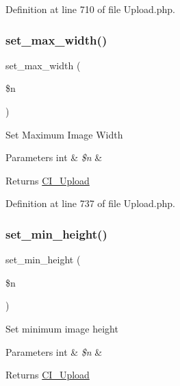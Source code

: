 Definition at line 710 of file Upload.\+php.

\mbox{\label{class_c_i___upload_a4028f187a825a666976cc3fe47cd44a8}} 
\subsubsection{\texorpdfstring{set\_max\_width()}{set\_max\_width()}}
{\footnotesize\ttfamily set\+\_\+max\+\_\+width (\begin{DoxyParamCaption}\item[{}]{\$n }\end{DoxyParamCaption})}

Set Maximum Image Width


\begin{DoxyParams}[1]{Parameters}
int & {\em \$n} & \\
\hline
\end{DoxyParams}
\begin{DoxyReturn}{Returns}
\mbox{\hyperlink{class_c_i___upload}{C\+I\+\_\+\+Upload}} 
\end{DoxyReturn}


Definition at line 737 of file Upload.\+php.

\mbox{\label{class_c_i___upload_a72c6007605b27c92dfd83c6e21fe82e3}} 
\subsubsection{\texorpdfstring{set\_min\_height()}{set\_min\_height()}}
{\footnotesize\ttfamily set\+\_\+min\+\_\+height (\begin{DoxyParamCaption}\item[{}]{\$n }\end{DoxyParamCaption})}

Set minimum image height


\begin{DoxyParams}[1]{Parameters}
int & {\em \$n} & \\
\hline
\end{DoxyParams}
\begin{DoxyReturn}{Returns}
\mbox{\hyperlink{class_c_i___upload}{C\+I\+\_\+\+Upload}} 
\end{DoxyReturn}


